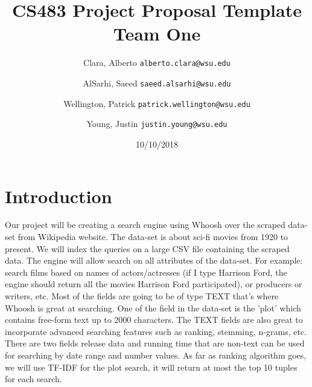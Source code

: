 \documentclass[11pt]{article}
\title{CS483 Project Proposal Template\\
\large Team One}
\author{
  Clara, Alberto      \texttt{alberto.clara@wsu.edu}
  \and
  AlSarhi, Saeed      \texttt{saeed.alsarhi@wsu.edu}
  \and
  Wellington, Patrick      \texttt{patrick.wellington@wsu.edu}
  \and
  Young, Justin      \texttt{justin.young@wsu.edu}
}
\date{10/10/2018}
\begin{document}
\maketitle

\section{Introduction}
Our project will be creating a search engine  using Whoosh over the scraped data-set from Wikipedia website. The data-set is about sci-fi movies from 1920 to present. We will index the queries on a large CSV file containing the scraped data. The engine will allow search on all attributes of the data-set. For example: search films based on names of actors/actresses (if I type Harrison Ford, the engine should return all the movies Harrison Ford participated), or producers or writers, etc.  Most of the fields are going to be of type TEXT that's where Whoosh is great at searching. One of the field in the data-set is the 'plot' which contains free-form text up to 2000 characters. The TEXT fields are also great to incorporate advanced searching features such as ranking, stemming, n-grams, etc.  There are two fields release data and running time that are non-text can be used for searching by date range and number values. As far as ranking algorithm goes, we will use TF-IDF for the plot search, it will return at most the top 10 tuples for each search.
\end{document}
